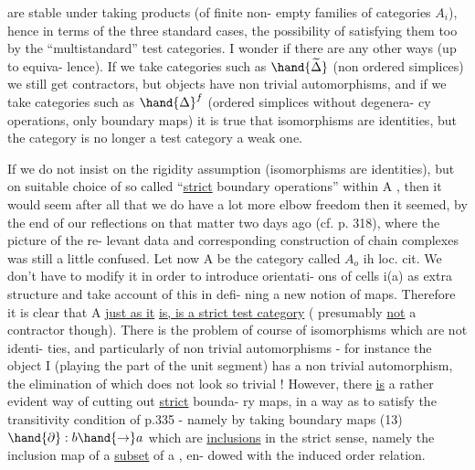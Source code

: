 
 are stable under taking  products (of finite non-%
empty families of categories $A_i$), hence in terms of the three standard
cases, the possibility of satisfying them too by the ``multistandard''
test categories. I wonder if there are any other ways (up to equiva-%
lence). If we take categories such as $\hand{\widetilde{\Delta}}$ (non ordered simplices) we
still get contractors, but objects have non trivial automorphisms, and
if we take categories such as $\hand{\Delta}^{f}$ (ordered simplices without degenera-%
cy operations, only boundary maps) it is true that isomorphisms are
identities, but the category is no longer a test category  a
weak one.

If we do not insist on the rigidity assumption (isomorphisms are
identities), but on suitable choice of so called ``\uline{strict} boundary
operations'' within A , then it would seem after all that we do have
a lot more elbow freedom then it seemed, by the end of our reflections
on that matter two days ago (cf. p. 318), where the picture of the re-%
levant data and corresponding  construction of chain complexes
was still a little confused. Let now A be the category called $A_o$ ih
loc. cit. We don't have to modify it in order to introduce orientati-%
ons of cells i(a) as extra structure and take account of this in defi-%
ning  a new notion of maps. Therefore it is clear that A \uline{just as it}
\uline{is, is a strict test category} ( presumably \uline{not} a contractor though).
There is the problem of course of isomorphisms which are not identi-%
ties, and particularly of non trivial automorphisms - for instance
the object I (playing the part of the unit segment) has a non trivial
automorphism, the elimination of which does not look so trivial !
However, there \uline{is} a rather evident way of cutting out \uline{strict} bounda-%
ry maps, in a way as to satisfy the transitivity condition of p.335
- namely by taking boundary maps (13) $\hand{\partial}: b \hand{\to} a$ which are \uline{inclusions}
in the strict sense, namely the inclusion map of a \uline{subset} of a , en-%
dowed with the induced order relation.

